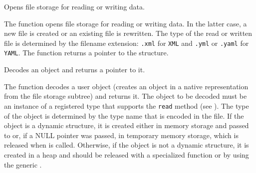 Opens file storage for reading or writing data.


\begin{description}
\end{description}

The function opens file storage for
reading or writing data. In the latter case, a new file is created
or an existing file is rewritten. The type of the read or written file is
determined by the filename extension: \texttt{.xml} for \texttt{XML}
and \texttt{.yml} or \texttt{.yaml} for \texttt{YAML}. The function
returns a pointer to the  structure.

Decodes an object and returns a pointer to it.


\begin{description}
\end{description}

The function decodes a user object (creates an object in a
native representation from the file storage subtree) and returns it. The
object to be decoded must be an instance of a registered type that supports the
\texttt{read} method (see ). The type of the object is
determined by the type name that is encoded in the file. If the object
is a dynamic structure, it is created either in memory storage and passed to
 or, if a NULL pointer was passed, in temporary
memory storage, which is released when  is
called. Otherwise, if the object is not a dynamic structure, it is
created in a heap and should be released with a specialized function or by
using the generic .

